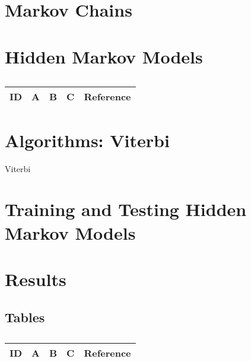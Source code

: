 \section{Markov Chains}

\section{Hidden Markov Models}

\centering
\begin{table}[H]\footnotesize
	\caption{}
	\begin{tabular}{rp{1cm}p{2cm}p{3cm}p{1cm}}
		\hline
		ID & A & B & C & Reference \\
		\hline
		\hline
	\end{tabular}
\end{table}
\raggedright

\section{Algorithms: Viterbi}

\begin{algorithm}[H]
	\footnotesize
	\begin{algorithmic}[1]
	\State 
	\end{algorithmic}
	\caption{Viterbi}\label{Viterbi_1}
\end{algorithm}


\section{Training and Testing Hidden Markov Models}

\section{Results}

\begin{enumerate}
\end{enumerate}

\subsection{Tables}

\centering
\begin{table}[H]\footnotesize
	\caption{}
	\begin{tabular}{rp{1cm}p{2cm}p{3cm}p{1cm}}
		\hline
		ID & A & B & C & Reference \\
		\hline
		\hline
	\end{tabular}
\end{table}
\raggedright

